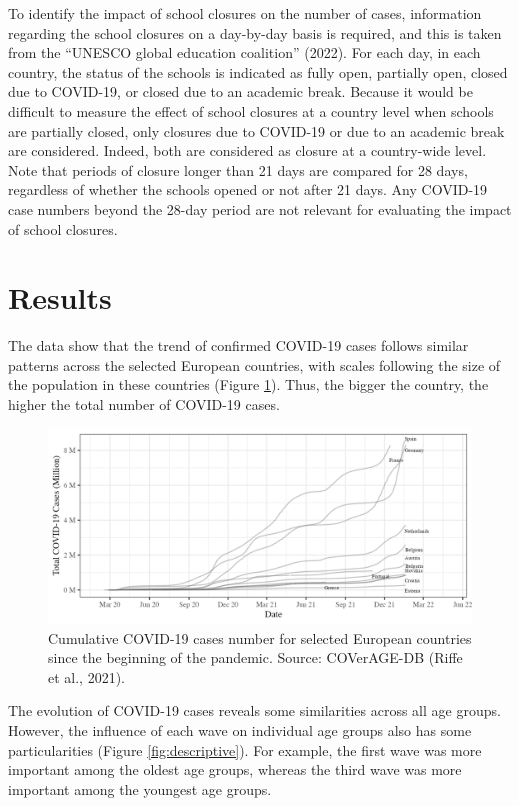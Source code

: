 \documentclass[unnumsec,webpdf,contemporary,large]{oup-authoring-template}%
\theoremstyle{thmstyleone}%
\theoremstyle{thmstyletwo}%
\theoremstyle{thmstylethree}%
\begin{document}
To identify the impact of school closures on the number of cases, information regarding the school closures on a day-by-day basis is required, and this is taken from the ``UNESCO global education coalition'' (2022). For each day, in each country, the status of the schools is indicated as fully open, partially open, closed due to COVID-19, or closed due to an academic break. Because it would be difficult to measure the effect of school closures at a country level when schools are partially closed, only closures due to COVID-19 or due to an academic break are considered. Indeed, both are considered as closure at a country-wide level. Note that periods of closure longer than 21 days are compared for 28 days, regardless of whether the schools opened or not after 21 days. Any COVID-19 case numbers beyond the 28-day period are not relevant for evaluating the impact of school closures.

\hypertarget{results}{%
\section{Results}\label{results}}

The data show that the trend of confirmed COVID-19 cases follows similar patterns across the selected European countries, with scales following the size of the population in these countries (Figure \ref{fig:overall}). Thus, the bigger the country, the higher the total number of COVID-19 cases.

\begin{figure}
\includegraphics[width=\textwidth]{manuscript_files/figure-latex/overall-1} \caption{Cumulative COVID-19 cases number for selected European countries since the beginning of the pandemic. Source: COVerAGE-DB (Riffe et al., 2021).}\label{fig:overall}
\end{figure}

The evolution of COVID-19 cases reveals some similarities across all age groups. However, the influence of each wave on individual age groups also has some particularities (Figure \ref{fig:descriptive}). For example, the first wave was more important among the oldest age groups, whereas the third wave was more important among the youngest age groups.
\end{document}
